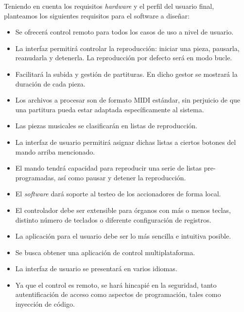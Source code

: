 Teniendo en cuenta los requisitos \textit{hardware} y el perfil del usuario final, planteamos los siguientes requisitos para el software a diseñar:

\begin{itemize}

	\item Se ofrecerá control remoto para todos los casos de uso a nivel de usuario.
	
	\item La interfaz permitirá controlar la reproducción: iniciar una pieza, pausarla, reanudarla y detenerla. La reproducción por defecto será en modo bucle.
	
	\item Facilitará la subida y gestión de partituras. En dicho gestor se mostrará la duración de cada pieza.
	
	\item Los archivos a procesar son de formato MIDI estándar, sin perjuicio de que una partitura pueda estar adaptada específicamente al sistema.
	
	\item Las piezas musicales se clasificarán en listas de reproducción.
	
	\item La interfaz de usuario permitirá asignar dichas listas a ciertos botones del mando arriba mencionado.
	
	\item El mando tendrá capacidad para reproducir una serie de listas pre-programadas, así como pausar y detener la reproducción.
	
	\item El \textit{software} dará soporte al testeo de los accionadores de forma local.
	
	\item El controlador debe ser extensible para órganos con más o menos teclas, distinto número de teclados o diferente configuración de registros.
	
	\item La aplicación para el usuario debe ser lo más sencilla e intuitiva posible.
	
	\item Se busca obtener una aplicación de control multiplataforma.
	
	\item La interfaz de usuario se presentará en varios idiomas.
	
	\item Ya que el control es remoto, se hará hincapié en la seguridad, tanto autentificación de acceso como aspectos de programación, tales como inyección de código.

\end{itemize}

